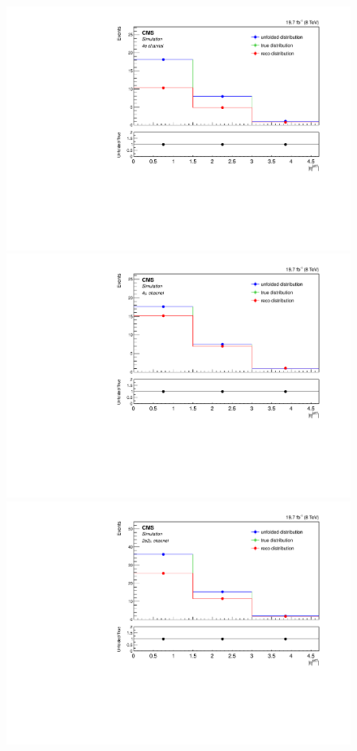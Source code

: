 \begin{figure}[hbtp]
\begin{center}
     \includegraphics[width=0.8\cmsFigWidth]{Figures/Unfolding/MCTests/EtaJet1_ZZTo4e_PowMatrix_PowDistr_FullSample_fr}     
    \includegraphics[width=0.8\cmsFigWidth]{Figures/Unfolding/MCTests/EtaJet1_ZZTo4m_PowMatrix_PowDistr_FullSample_fr}     
    \includegraphics[width=0.8\cmsFigWidth]{Figures/Unfolding/MCTests/EtaJet1_ZZTo2e2m_PowMatrix_PowDistr_FullSample_fr}      

\end{center}
\end{figure}
